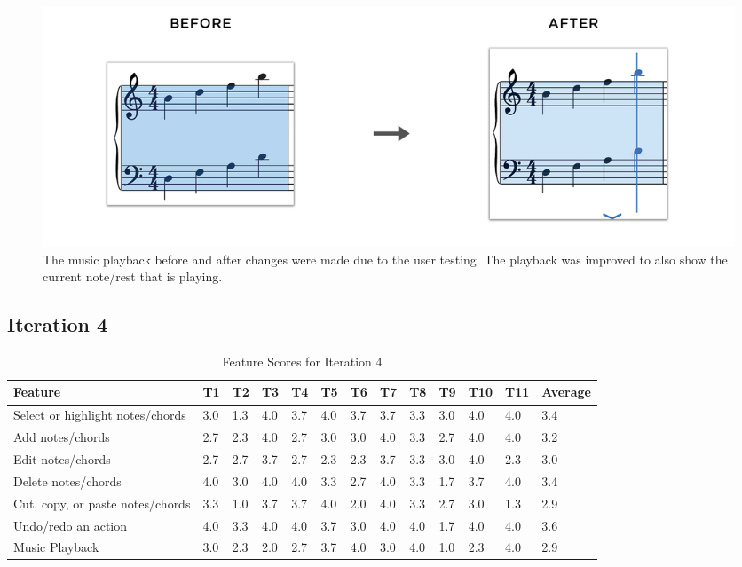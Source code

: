 			\begin{figure}[h]
				\centering
				\includegraphics[scale=0.25]{figures/before-after-playback.png}
			    \caption{The music playback before and after changes were made due to the user testing. The playback was improved to also show the current note/rest that is playing.}
			    \label{fig:before-after-playback}
			\end{figure}


		\subsection{Iteration 4} %
		\label{sub:iteration_4}

			 \begin{landscape}				
				\begin{longtable}{|p{3.5cm}|R{.7cm}|R{.7cm}|R{.7cm}|R{.7cm}|R{.7cm}|R{.7cm}|R{.7cm}|R{.7cm}|R{.7cm}|R{.7cm}|R{.7cm}|R{1.5cm}|}
					\caption{Feature Scores for Iteration 4} \label{tab:results-features-it4} \\
					  	\hline
					  	\textbf{Feature} & \textbf{T1} & \textbf{T2} & \textbf{T3} & \textbf{T4} & \textbf{T5} & \textbf{T6} & \textbf{T7} & \textbf{T8} & \textbf{T9} & \textbf{T10} & \textbf{T11} & \textbf{Average} \\ \hline

					  	Select or highlight notes/chords 		& 3.0 & 1.3 & 4.0 & 3.7 & 4.0 & 3.7 & 3.7 & 3.3 & 3.0 & 4.0 & 4.0 & 3.4 \\ \hline
						Add notes/chords 							& 2.7 & 2.3 & 4.0 & 2.7 & 3.0 & 3.0 & 4.0 & 3.3 & 2.7 & 4.0 & 4.0 & 3.2 \\ \hline
						Edit notes/chords 							& 2.7 & 2.7 & 3.7 & 2.7 & 2.3 & 2.3 & 3.7 & 3.3 & 3.0 & 4.0 & 2.3 & 3.0 \\ \hline
						Delete notes/chords 						& 4.0 & 3.0 & 4.0 & 4.0 & 3.3 & 2.7 & 4.0 & 3.3 & 1.7 & 3.7 & 4.0 & 3.4 \\ \hline
						Cut, copy, or paste notes/chords 	& 3.3 & 1.0 & 3.7 & 3.7 & 4.0 & 2.0 & 4.0 & 3.3 & 2.7 & 3.0 & 1.3 & 2.9 \\ \hline
						Undo/redo an action 						& 4.0 & 3.3 & 4.0 & 4.0 & 3.7 & 3.0 & 4.0 & 4.0 & 1.7 & 4.0 & 4.0 & 3.6 \\ \hline
						Music Playback 								& 3.0 & 2.3 & 2.0 & 2.7 & 3.7 & 4.0 & 3.0 & 4.0 & 1.0 & 2.3 & 4.0 & 2.9 \\ \hline

				\end{longtable}
			\end{landscape} 

